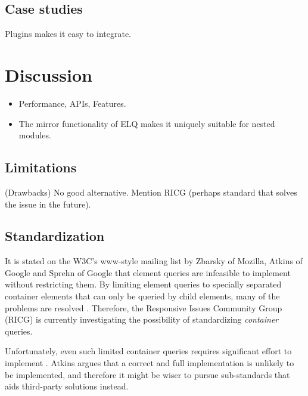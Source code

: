 \documentclass{acm_proc_article-sp}
\newcommand{\elq}{ELQ}
\begin{document}
  \subsection{Case studies}
    Plugins makes it easy to integrate.



\section{Discussion}
  \begin{itemize}
    \item Performance, APIs, Features.
    \item The mirror functionality of \elq{} makes it uniquely suitable for nested modules.
  \end{itemize}

  \subsection{Limitations}
    (Drawbacks)
    No good alternative.
    Mention RICG (perhaps standard that solves the issue in the future).


  \subsection{Standardization}
    It is stated on the W3C's www-style mailing list \cite{w3c_eq_mail} by Zbarsky of Mozilla, Atkins of Google and Sprehn of Google that element queries are infeasible to implement without restricting them.
    By limiting element queries to specially separated container elements that can only be queried by child elements, many of the problems are resolved \cite{ricg_irc_log,ricg_issue_viewport}.
    Therefore, the Responsive Issues Community Group (RICG) is currently investigating the possibility of standardizing \emph{container} queries.

    Unfortunately, even such limited container queries requires significant effort to implement \cite{ricg_issue_viewport}.
    Atkins argues that a correct and full implementation is unlikely to be implemented, and therefore it might be wiser to pursue sub-standards that aids third-party solutions instead.
   
\end{document}
